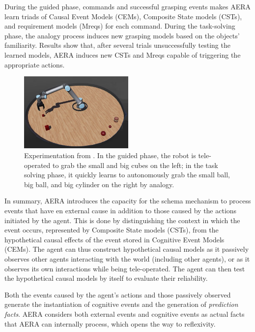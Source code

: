 \documentclass[runningheads]{llncs}
\begin{document}
During the guided phase, commands and successful grasping events makes AERA learn triads of Causal Event Models (CEMs), Composite State models (CSTs), and requirement models (Mreqs) for each command. 
During the task-solving phase, the analogy process induces new grasping models based on the objects’ familiarity.
Results show that, after several trials unsuccessfully testing the learned models, AERA induces new CSTs and Mreqs capable of triggering the appropriate actions. 

\begin{figure}
	\centering
	\includegraphics[width=0.5\textwidth]{Figure_Robot_AERA.png}
	\caption{Experimentation from \cite[Fig. 2]{thorisson_causal_2024}.
	In the guided phase, the robot is tele-operated to grab the small and big cubes on the left; 
	in the task solving phase, it quickly learns to autonomously grab the small ball, big ball, and big cylinder on the right by analogy.} 
	\label{fig:robot_aera}
\end{figure}

In summary, AERA introduces the capacity for the schema mechanism to process events that have en external cause in addition to those caused by the actions initiated by the agent.
This is done by distinguishing the context in which the event occurs, represented by Composite State models (CSTs), from the hypothetical causal effects of the event stored in Cognitive Event Models (CEMs).
The agent can thus construct hypothetical causal models as it passively observes other agents interacting with the world (including other agents), or as it observes its own interactions while being tele-operated.
The agent can then test the hypothetical causal models by itself to evaluate their reliability. 

Both the events caused by the agent's actions and those passively observed generate the instantiation of cognitive events and the generation of \textit{prediction facts}.  
AERA considers both external events and cognitive events as actual facts that AERA can internally process, which opens the way to reflexivity. 
\end{document}
